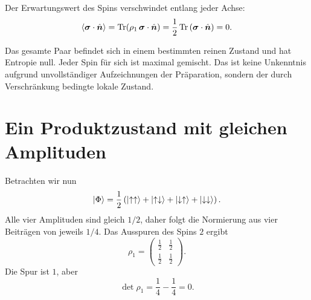 Der Erwartungswert des Spins verschwindet entlang jeder Achse:
\begin{equation}
\left\langle\bm{\sigma}\cdot\hat{\bm n}\right\rangle
=\operatorname{Tr}\!\left(
\rho_1\,\bm{\sigma}\cdot\hat{\bm n}
\right)
=\frac12\operatorname{Tr}
\left(\bm{\sigma}\cdot\hat{\bm n}\right)
=0.
\end{equation}

\begin{classroomqa}
\end{classroomqa}

Das gesamte Paar befindet sich in einem bestimmten reinen Zustand und hat Entropie null. Jeder Spin für sich ist maximal gemischt. Das ist keine Unkenntnis aufgrund unvollständiger Aufzeichnungen der Präparation, sondern der durch Verschränkung bedingte lokale Zustand.

\section{Ein Produktzustand mit gleichen Amplituden}

Betrachten wir nun
\begin{equation}
\left\lvert\Phi\right\rangle
=\frac12\left(
\left\lvert\uparrow\uparrow\right\rangle
+\left\lvert\uparrow\downarrow\right\rangle
+\left\lvert\downarrow\uparrow\right\rangle
+\left\lvert\downarrow\downarrow\right\rangle
\right).
\end{equation}
Alle vier Amplituden sind gleich \(1/2\), daher folgt die Normierung aus vier Beiträgen von jeweils \(1/4\). Das Ausspuren des Spins \(2\) ergibt
\begin{equation}
\rho_1
=
\begin{pmatrix}
\frac12&\frac12\\[2pt]
\frac12&\frac12
\end{pmatrix}.
\end{equation}
Die Spur ist \(1\), aber
\begin{equation}
\det\rho_1
=\frac14-\frac14
=0.
\end{equation}

\begin{classroomqa}
\end{classroomqa}

